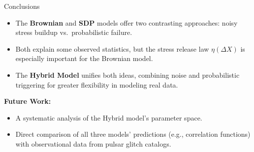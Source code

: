 \begin{frame}{Conclusions}

    \setlength{\leftmargini}{1em}
    \begin{itemize}
        \item The \textbf{Brownian} and \textbf{SDP} models offer two contrasting approaches: noisy stress buildup vs.\ probabilistic failure.
        \item Both explain some observed statistics, but the stress release law $\eta(\Delta X)$ is especially important for the Brownian model.
        \item The \textbf{Hybrid Model} unifies both ideas, combining noise and probabilistic triggering for greater flexibility in modeling real data.
    \end{itemize}
    
    \textbf{Future Work:}
    \begin{itemize}
        \item A systematic analysis of the Hybrid model's parameter space.
        \item Direct comparison of all three models' predictions (e.g., correlation functions) with observational data from pulsar glitch catalogs.
    \end{itemize}
\end{frame}
